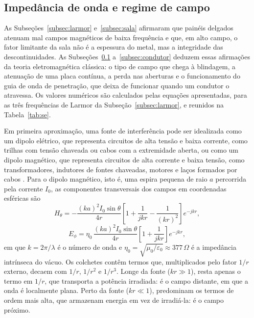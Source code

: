 \documentclass[portuguese]{sbcreviews-2025}%
\begin{document}
\subsection{Impedância de onda e regime de campo}
\label{subsec:impedancia}

As Subseções~\ref{subsec:larmor} e~\ref{subsec:sala} afirmaram que painéis delgados atenuam mal campos magnéticos de baixa frequência e que, em alto campo, o fator limitante da sala não é a espessura do metal, mas a integridade das descontinuidades. As Subseções~\ref{subsec:impedancia} a~\ref{subsec:condutor} deduzem essas afirmações da teoria eletromagnética clássica: o tipo de campo que chega à blindagem, a atenuação de uma placa contínua, a perda nas aberturas e o funcionamento do guia de onda de penetração, que deixa de funcionar quando um condutor o atravessa. Os valores numéricos são calculados pelas equações apresentadas, para as três frequências de Larmor da Subseção~\ref{subsec:larmor}, e reunidos na Tabela~\ref{tab:se}.

Em primeira aproximação, uma fonte de interferência pode ser idealizada como um dipolo elétrico, que representa circuitos de alta tensão e baixa corrente, como trilhas com tensão chaveada ou cabos com a extremidade aberta, ou como um dipolo magnético, que representa circuitos de alta corrente e baixa tensão, como transformadores, indutores de fontes chaveadas, motores e laços formados por cabos \citep{balanis2016, ott2009}. Para o dipolo magnético, isto é, uma espira pequena de raio $a$ percorrida pela corrente $I_0$, as componentes transversais dos campos em coordenadas esféricas são \citep{balanis2016}
\begin{equation}
H_\theta = -\frac{(ka)^2 I_0 \sin\theta}{4r}\left[1 + \frac{1}{jkr} - \frac{1}{(kr)^2}\right] e^{-jkr},
\label{eq:Htheta}
\end{equation}
\begin{equation}
E_\phi = \eta_0\,\frac{(ka)^2 I_0 \sin\theta}{4r}\left[1 + \frac{1}{jkr}\right] e^{-jkr},
\label{eq:Ephi}
\end{equation}
em que $k = 2\pi/\lambda$ é o número de onda e $\eta_0 = \sqrt{\mu_0/\varepsilon_0} \approx 377\,\Omega$ é a impedância intrínseca do vácuo. Os colchetes contêm termos que, multiplicados pelo fator $1/r$ externo, decaem com $1/r$, $1/r^2$ e $1/r^3$. Longe da fonte ($kr \gg 1$), resta apenas o termo em $1/r$, que transporta a potência irradiada: é o campo distante, em que a onda é localmente plana. Perto da fonte ($kr \ll 1$), predominam os termos de ordem mais alta, que armazenam energia em vez de irradiá-la: é o campo próximo.
\end{document}
